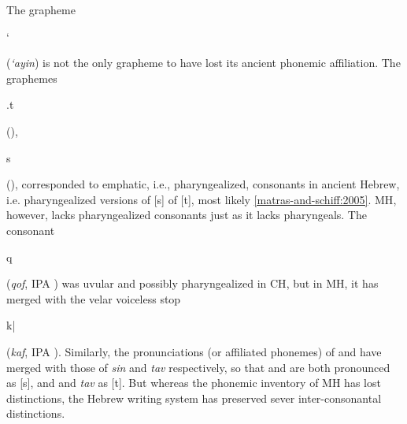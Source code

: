 The grapheme \begin{cjhebrew}`\end{cjhebrew} (\textit{`ayin}) is not the only 
grapheme to have 
lost its ancient phonemic affiliation. 
The graphemes \begin{cjhebrew}.t\end{cjhebrew} 
(\textit{}), \begin{cjhebrew}s\end{cjhebrew} 
(\textit{}), corresponded to emphatic, i.e., 
pharyngealized, consonants in ancient 
Hebrew, i.e. pharyngealized versions of [s] of [t], most likely 
\ref{matras-and-schiff:2005}.
\ac{MH}, however, lacks pharyngealized consonants just as 
it lacks pharyngeals. 
The consonant \begin{cjhebrew}q\end{cjhebrew} (\textit{qof}, 
IPA \textipa{[q]}) was uvular and 
possibly pharyngealized in \ac{CH}, but in \ac{MH}, 
it has merged with the velar voiceless stop
\begin{cjhebrew}k|\end{cjhebrew} (\textit{kaf}, IPA \textipa{[k]}).
Similarly, the pronunciations (or affiliated phonemes) of 
\textit{} and \textit{} 
have merged with those of \textit{sin} and \textit{tav} respectively, 
 so that \textit{} and \textit{} 
 are both pronounced as [s], and \textit{} and 
 \textit{tav} as [t]. But whereas the phonemic inventory of 
 \ac{MH} has lost distinctions, the Hebrew writing system has preserved sever inter-consonantal distinctions.

